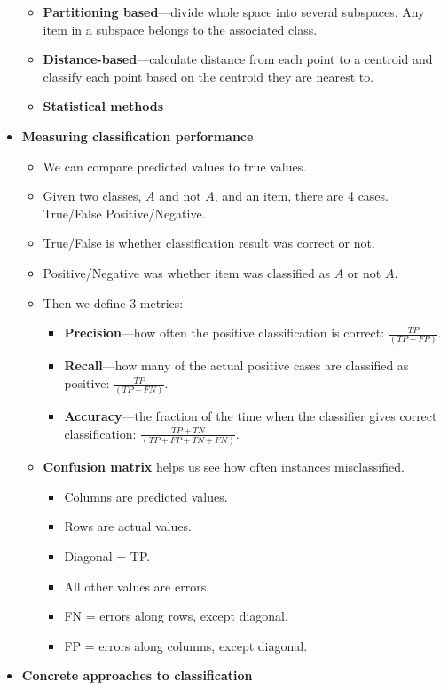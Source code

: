 \begin{multicols}{2}
\begin{itemize}
  \begin{itemize}
    \item
    \textbf{Partitioning based}---divide whole space into several
    subspaces. Any item in a subspace belongs to the associated class.
  \item
    \textbf{Distance-based}---calculate distance from each point to a
    centroid and classify each point based on the centroid they are
    nearest to.
  \item
    \textbf{Statistical methods}
  \end{itemize}
\item
  \textbf{Measuring classification performance}

  \begin{itemize}
    \item
    We can compare predicted values to true values.
  \item
    Given two classes, \(A\) and not \(A\), and an item, there are 4
    cases. True/False Positive/Negative.
  \item
    True/False is whether classification result was correct or not.
  \item
    Positive/Negative was whether item was classified as \(A\) or not
    \(A\).
  \item
    Then we define 3 metrics:

    \begin{itemize}
        \item
      \textbf{Precision}---how often the positive classification is
      correct: \(\frac{TP}{(TP+FP)}\).
    \item
      \textbf{Recall}---how many of the actual positive cases are
      classified as positive: \(\frac{TP}{(TP+FN)}\).
    \item
      \textbf{Accuracy}---the fraction of the time when the classifier
      gives correct classification: \(\frac{TP+TN}{(TP+FP+TN+FN)}\).
    \end{itemize}
  \item
    \textbf{Confusion matrix} helps us see how often instances
    misclassified.

    \begin{itemize}
        \item
      Columns are predicted values.
    \item
      Rows are actual values.
    \item
      Diagonal = TP.
    \item
      All other values are errors.
    \item
      FN = errors along rows, except diagonal.
    \item
      FP = errors along columns, except diagonal.
    \end{itemize}
  \end{itemize}
\item
  \textbf{Concrete approaches to classification}


\end{itemize}
\end{multicols}
